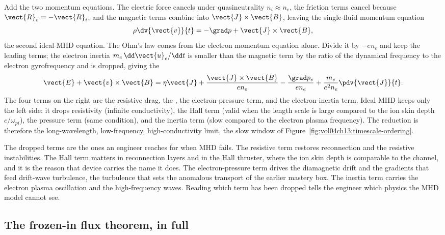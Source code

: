 Add the two momentum equations. The electric force cancels under
quasineutrality $n_{i} \approx n_{e}$, the friction terms cancel because
$\vect{R}_{e} = -\vect{R}_{i}$, and the magnetic terms combine into
$\vect{J}\times\vect{B}$, leaving the single-fluid momentum equation
\[
\rho\dv{\vect{v}}{t} = -\grad p + \vect{J}\times\vect{B},
\]
the second ideal-MHD equation. The Ohm's law comes from the electron
momentum equation alone. Divide it by $-e n_{e}$ and keep the leading terms;
the electron inertia $m_{e}\,\dd\vect{u}_{e}/\dd t$ is smaller than the
magnetic term by the ratio of the dynamical frequency to the electron
gyrofrequency and is dropped, giving the 
\[
\vect{E} + \vect{v}\times\vect{B}
= \eta\vect{J}
+ \frac{\vect{J}\times\vect{B}}{en_{e}}
- \frac{\grad p_{e}}{en_{e}}
+ \frac{m_{e}}{e^{2}n_{e}}\pdv{\vect{J}}{t}.
\]
The four terms on the right are the resistive drag, the ,
the electron-pressure term, and the electron-inertia term. Ideal MHD keeps
only the left side: it drops resistivity (infinite conductivity), the Hall
term (valid when the length scale is large compared to the ion skin depth
$c/\omega_{pi}$), the pressure term (same condition), and the inertia term
(slow compared to the electron plasma frequency). The reduction is therefore
the long-wavelength, low-frequency, high-conductivity limit, the slow window
of Figure~\ref{fig:vol04ch13:timescale-ordering}.



The dropped terms are the ones an engineer reaches for when MHD fails. The
resistive term restores reconnection and the resistive instabilities. The
Hall term matters in reconnection layers and in the Hall thruster, where the
ion skin depth is comparable to the channel, and it is the reason that
device carries the name it does. The electron-pressure term drives the
diamagnetic drift and the gradients that feed drift-wave turbulence, the
turbulence that sets the anomalous transport of the earlier mastery box. The
inertia term carries the electron plasma oscillation and the high-frequency
waves. Reading which term has been dropped tells the engineer which physics
the MHD model cannot see.

\subsection{The frozen-in flux theorem, in full}

